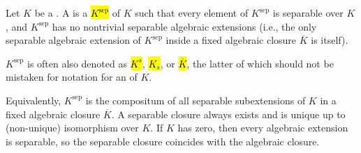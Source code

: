 \begin{definition} \label{definition:separable_closure_of_a_field}
    Let $K$ be a . A  is a  \hl{$K^{\text{sep}}$} of $K$ such that every element of $K^{\text{sep}}$ is separable over $K$, and $K^{\text{sep}}$ has no nontrivial separable algebraic extensions (i.e., the only separable algebraic extension of $K^{\text{sep}}$ inside a fixed algebraic closure $\overline{K}$ is itself).

    $K^{\text{sep}}$ is often also denoted as \hl{$K^s$}, \hl{$K_s$}, or \hl{$\overline{K}$}, the latter of which should not be mistaken for notation for an  of $K$.

    Equivalently, $K^{\text{sep}}$ is the compositum of all  separable subextensions of $K$ in a fixed algebraic closure $\overline{K}$. A separable closure always exists and is unique up to (non-unique) isomorphism over $K$. If $K$ has  zero, then every algebraic extension is separable, so the separable closure coincides with the algebraic closure.
\end{definition}
